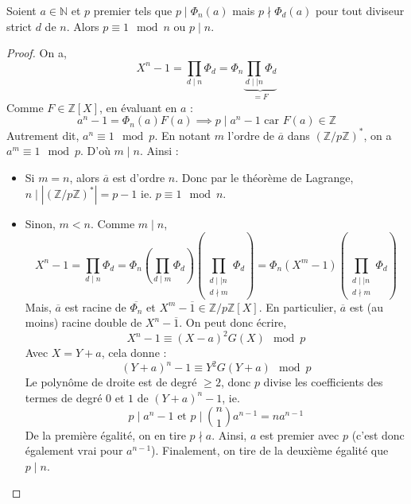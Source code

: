 






  \begin{lemma}
    \label{theoreme-de-dirichlet-faible-1}
    Soient $a \in \mathbb{N}$ et $p$ premier tels que $p \mid \Phi_n(a)$ mais $p \nmid \Phi_d(a)$ pour tout diviseur strict $d$ de $n$. Alors $p \equiv 1 \mod n$ ou $p \mid n$.
  \end{lemma}

  \begin{proof}
    On a,
    \[ X^n - 1 = \prod_{d \mid n} \Phi_d = \Phi_n \underbrace{\prod_{d \mid \mid n} \Phi_d}_{= F} \]
    Comme $F \in \mathbb{Z}[X]$, en évaluant en $a$ :
    \[ a^n - 1 = \Phi_n(a) F(a) \implies p \mid a^n - 1 \text{ car } F(a) \in \mathbb{Z} \]
    Autrement dit, $a^n \equiv 1 \mod p$. En notant $m$ l'ordre de $\overline{a}$ dans $(\mathbb{Z}/p\mathbb{Z})^*$, on a $a^m \equiv 1 \mod p$. D'où $m \mid n$. Ainsi :
    \begin{itemize}
      \item Si $m = n$, alors $\overline{a}$ est d'ordre $n$. Donc par le théorème de Lagrange, $n \mid |(\mathbb{Z}/p\mathbb{Z})^*| = p-1$ ie. $p \equiv 1 \mod n$.
      \item Sinon, $m < n$. Comme $m \mid n$,
      \[ X^n-1 = \prod_{d \mid n} \Phi_d = \Phi_n \left ( \prod_{d \mid m} \Phi_d \right ) \left ( \prod_{\substack{d \mid \mid n \\ d \nmid m}} \Phi_d \right ) = \Phi_n (X^m - 1) \left ( \prod_{\substack{d \mid \mid n \\ d \nmid m}} \Phi_d \right ) \]
      Mais, $\overline{a}$ est racine de $\overline{\Phi_n}$ et $X^m - \overline{1} \in \mathbb{Z}/p\mathbb{Z}[X]$. En particulier, $\overline{a}$ est (au moins) racine double de $X^n - \overline{1}$. On peut donc écrire,
      \[ X^n - 1 \equiv (X-a)^2 G(X) \mod p \]
      Avec $X = Y+a$, cela donne :
      \[ (Y+a)^n - 1 \equiv Y^2 G(Y+a) \mod p \]
      Le polynôme de droite est de degré $\geq 2$, donc $p$ divise les coefficients des termes de degré $0$ et $1$ de $(Y+a)^n-1$, ie.
      \[ p \mid a^n - 1 \text{ et } p \mid \binom{n}{1} a^{n-1} = n a^{n-1} \]
      De la première égalité, on en tire $p \nmid a$. Ainsi, $a$ est premier avec $p$ (c'est donc également vrai pour $a^{n-1}$). Finalement, on tire de la deuxième égalité que $p \mid n$.
    \end{itemize}
  \end{proof}

